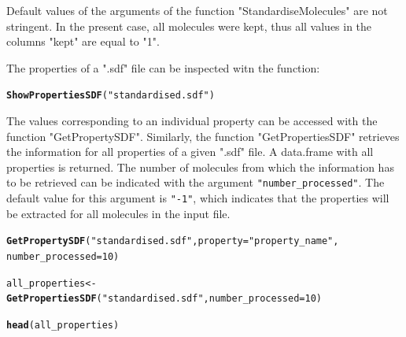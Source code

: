 \documentclass[twoside,a4wide,12pt]{article}\usepackage[]{graphicx}\usepackage[]{color}
\makeatletter
\newcommand{\hlnum}[1]{\textcolor[rgb]{0.686,0.059,0.569}{#1}}%
\newcommand{\hlstr}[1]{\textcolor[rgb]{0.192,0.494,0.8}{#1}}%
\newcommand{\hlstd}[1]{\textcolor[rgb]{0.345,0.345,0.345}{#1}}%
\newcommand{\hlkwb}[1]{\textcolor[rgb]{0.69,0.353,0.396}{#1}}%
\newcommand{\hlkwc}[1]{\textcolor[rgb]{0.333,0.667,0.333}{#1}}%
\newcommand{\hlkwd}[1]{\textcolor[rgb]{0.737,0.353,0.396}{\textbf{#1}}}%
\newenvironment{kframe}{%
 \def\at@end@of@kframe{}%
 \ifinner\ifhmode%
  \def\at@end@of@kframe{\end{minipage}}%
  \begin{minipage}{\columnwidth}%
 \fi\fi%
 \def\FrameCommand##1{\hskip\@totalleftmargin \hskip-\fboxsep
 \colorbox{shadecolor}{##1}\hskip-\fboxsep
     \hskip-\linewidth \hskip-\@totalleftmargin \hskip\columnwidth}%
 \MakeFramed {\advance\hsize-\width
   \@totalleftmargin\z@ \linewidth\hsize
   \@setminipage}}%
 {\par\unskip\endMakeFramed%
 \at@end@of@kframe}
\newenvironment{knitrout}{}{} %
\makeatother
\begin{document}
Default values of the arguments of the function "StandardiseMolecules" are not stringent.
In the present case, all molecules were kept, thus all values in the columns "kept"
are equal to "1".

The properties of a ".sdf" file can be inspected witn the function:
\begin{knitrout}
\color{fgcolor}\begin{kframe}
\begin{alltt}
\hlkwd{ShowPropertiesSDF}\hlstd{(}\hlstr{"standardised.sdf"}\hlstd{)}
\end{alltt}
\end{kframe}
\end{knitrout}

The values corresponding to an individual property can be accessed with the function "GetPropertySDF".
Similarly, the function "GetPropertiesSDF" retrieves the information for all properties of a given ".sdf" file. A data.frame with all properties is returned.
The number of molecules from which the information has to be retrieved can be indicated with the argument \verb|"number_processed"|.
The default value for this argument is \verb|"-1"|, which indicates that the properties will be extracted for all molecules in the input file.
\begin{knitrout}
\color{fgcolor}\begin{kframe}
\begin{alltt}
\hlkwd{GetPropertySDF}\hlstd{(}\hlstr{"standardised.sdf"}\hlstd{,} \hlkwc{property} \hlstd{=} \hlstr{"property_name"}\hlstd{,}
    \hlkwc{number_processed} \hlstd{=} \hlnum{10}\hlstd{)}
\end{alltt}


{\ttfamily\noindent\bfseries\color{errorcolor}{\#\# Error: line 2 did not have 11 elements}}\begin{alltt}
\hlstd{all_properties} \hlkwb{<-} \hlkwd{GetPropertiesSDF}\hlstd{(}\hlstr{"standardised.sdf"}\hlstd{,} \hlkwc{number_processed} \hlstd{=} \hlnum{10}\hlstd{)}
\end{alltt}


{\ttfamily\noindent\bfseries\color{errorcolor}{\#\# Error: no lines available in input}}\begin{alltt}
\hlkwd{head}\hlstd{(all_properties)}
\end{alltt}


{\ttfamily\noindent\bfseries\color{errorcolor}{\#\# Error: error in evaluating the argument 'x' in selecting a method for function 'head': Error: object 'all\_properties' not found}}\end{kframe}
\end{knitrout}
\end{document}
